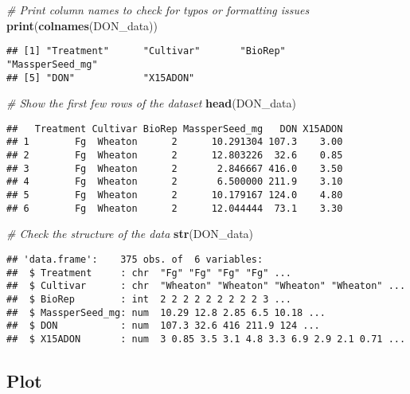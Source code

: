 \documentclass[
]{article}
\newenvironment{Shaded}{\begin{snugshade}}{\end{snugshade}}
\newcommand{\CommentTok}[1]{\textcolor[rgb]{0.56,0.35,0.01}{\textit{#1}}}
\newcommand{\FunctionTok}[1]{\textcolor[rgb]{0.13,0.29,0.53}{\textbf{#1}}}
\newcommand{\NormalTok}[1]{#1}
\begin{document}
\begin{Shaded}
\begin{Highlighting}[]
\CommentTok{\# Print column names to check for typos or formatting issues}
\FunctionTok{print}\NormalTok{(}\FunctionTok{colnames}\NormalTok{(DON\_data))}
\end{Highlighting}
\end{Shaded}

\begin{verbatim}
## [1] "Treatment"      "Cultivar"       "BioRep"         "MassperSeed_mg"
## [5] "DON"            "X15ADON"
\end{verbatim}

\begin{Shaded}
\begin{Highlighting}[]
\CommentTok{\# Show the first few rows of the dataset}
\FunctionTok{head}\NormalTok{(DON\_data)}
\end{Highlighting}
\end{Shaded}

\begin{verbatim}
##   Treatment Cultivar BioRep MassperSeed_mg   DON X15ADON
## 1        Fg  Wheaton      2      10.291304 107.3    3.00
## 2        Fg  Wheaton      2      12.803226  32.6    0.85
## 3        Fg  Wheaton      2       2.846667 416.0    3.50
## 4        Fg  Wheaton      2       6.500000 211.9    3.10
## 5        Fg  Wheaton      2      10.179167 124.0    4.80
## 6        Fg  Wheaton      2      12.044444  73.1    3.30
\end{verbatim}

\begin{Shaded}
\begin{Highlighting}[]
\CommentTok{\# Check the structure of the data}
\FunctionTok{str}\NormalTok{(DON\_data)}
\end{Highlighting}
\end{Shaded}

\begin{verbatim}
## 'data.frame':    375 obs. of  6 variables:
##  $ Treatment     : chr  "Fg" "Fg" "Fg" "Fg" ...
##  $ Cultivar      : chr  "Wheaton" "Wheaton" "Wheaton" "Wheaton" ...
##  $ BioRep        : int  2 2 2 2 2 2 2 2 2 3 ...
##  $ MassperSeed_mg: num  10.29 12.8 2.85 6.5 10.18 ...
##  $ DON           : num  107.3 32.6 416 211.9 124 ...
##  $ X15ADON       : num  3 0.85 3.5 3.1 4.8 3.3 6.9 2.9 2.1 0.71 ...
\end{verbatim}

\subsection{\texorpdfstring{\textbf{Plot}}{Plot}}\label{plot}
\end{document}
